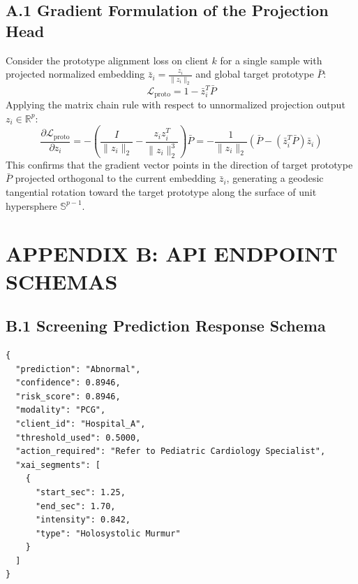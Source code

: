 \documentclass[12pt,a4paper]{amritareport}
\begin{document}
\section*{A.1 Gradient Formulation of the Projection Head}
Consider the prototype alignment loss on client $k$ for a single sample with projected normalized embedding $\bar{z}_i = \frac{z_i}{\|z_i\|_2}$ and global target prototype $\bar{P}$:
\begin{equation}
	\mathcal{L}_{\text{proto}} = 1 - \bar{z}_i^T \bar{P}
\end{equation}
Applying the matrix chain rule with respect to unnormalized projection output $z_i \in \mathbb{R}^p$:
\begin{equation}
	\frac{\partial \mathcal{L}_{\text{proto}}}{\partial z_i} = - \left(\frac{I}{\|z_i\|_2} - \frac{z_i z_i^T}{\|z_i\|_2^3}\right) \bar{P} = - \frac{1}{\|z_i\|_2} \left(\bar{P} - (\bar{z}_i^T \bar{P}) \bar{z}_i\right)
\end{equation}
This confirms that the gradient vector points in the direction of target prototype $\bar{P}$ projected orthogonal to the current embedding $\bar{z}_i$, generating a geodesic tangential rotation toward the target prototype along the surface of unit hypersphere $\mathbb{S}^{p-1}$.


\chapter*{APPENDIX B: API ENDPOINT SCHEMAS}

\section*{B.1 Screening Prediction Response Schema}
\begin{verbatim}
{
  "prediction": "Abnormal",
  "confidence": 0.8946,
  "risk_score": 0.8946,
  "modality": "PCG",
  "client_id": "Hospital_A",
  "threshold_used": 0.5000,
  "action_required": "Refer to Pediatric Cardiology Specialist",
  "xai_segments": [
    {
      "start_sec": 1.25,
      "end_sec": 1.70,
      "intensity": 0.842,
      "type": "Holosystolic Murmur"
    }
  ]
}
\end{verbatim}


\end{document}
